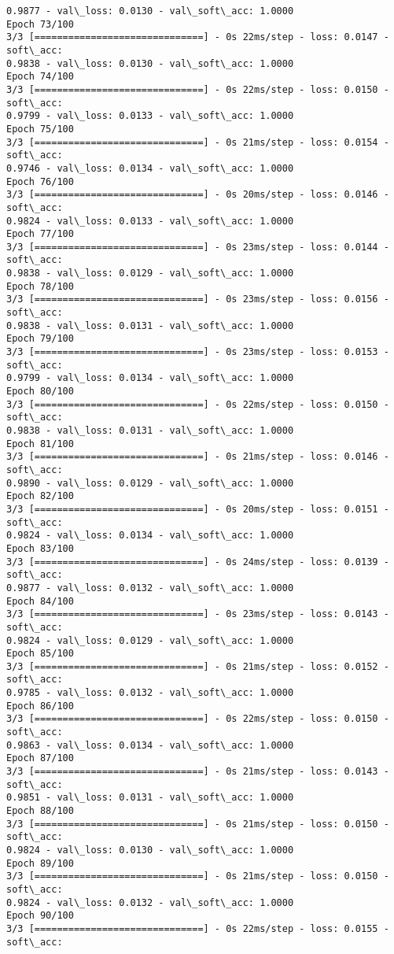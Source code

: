 \documentclass[11pt]{article}
\begin{document}
\begin{Verbatim}[commandchars=\\\{\}]
0.9877 - val\_loss: 0.0130 - val\_soft\_acc: 1.0000
Epoch 73/100
3/3 [==============================] - 0s 22ms/step - loss: 0.0147 - soft\_acc:
0.9838 - val\_loss: 0.0130 - val\_soft\_acc: 1.0000
Epoch 74/100
3/3 [==============================] - 0s 22ms/step - loss: 0.0150 - soft\_acc:
0.9799 - val\_loss: 0.0133 - val\_soft\_acc: 1.0000
Epoch 75/100
3/3 [==============================] - 0s 21ms/step - loss: 0.0154 - soft\_acc:
0.9746 - val\_loss: 0.0134 - val\_soft\_acc: 1.0000
Epoch 76/100
3/3 [==============================] - 0s 20ms/step - loss: 0.0146 - soft\_acc:
0.9824 - val\_loss: 0.0133 - val\_soft\_acc: 1.0000
Epoch 77/100
3/3 [==============================] - 0s 23ms/step - loss: 0.0144 - soft\_acc:
0.9838 - val\_loss: 0.0129 - val\_soft\_acc: 1.0000
Epoch 78/100
3/3 [==============================] - 0s 23ms/step - loss: 0.0156 - soft\_acc:
0.9838 - val\_loss: 0.0131 - val\_soft\_acc: 1.0000
Epoch 79/100
3/3 [==============================] - 0s 23ms/step - loss: 0.0153 - soft\_acc:
0.9799 - val\_loss: 0.0134 - val\_soft\_acc: 1.0000
Epoch 80/100
3/3 [==============================] - 0s 22ms/step - loss: 0.0150 - soft\_acc:
0.9838 - val\_loss: 0.0131 - val\_soft\_acc: 1.0000
Epoch 81/100
3/3 [==============================] - 0s 21ms/step - loss: 0.0146 - soft\_acc:
0.9890 - val\_loss: 0.0129 - val\_soft\_acc: 1.0000
Epoch 82/100
3/3 [==============================] - 0s 20ms/step - loss: 0.0151 - soft\_acc:
0.9824 - val\_loss: 0.0134 - val\_soft\_acc: 1.0000
Epoch 83/100
3/3 [==============================] - 0s 24ms/step - loss: 0.0139 - soft\_acc:
0.9877 - val\_loss: 0.0132 - val\_soft\_acc: 1.0000
Epoch 84/100
3/3 [==============================] - 0s 23ms/step - loss: 0.0143 - soft\_acc:
0.9824 - val\_loss: 0.0129 - val\_soft\_acc: 1.0000
Epoch 85/100
3/3 [==============================] - 0s 21ms/step - loss: 0.0152 - soft\_acc:
0.9785 - val\_loss: 0.0132 - val\_soft\_acc: 1.0000
Epoch 86/100
3/3 [==============================] - 0s 22ms/step - loss: 0.0150 - soft\_acc:
0.9863 - val\_loss: 0.0134 - val\_soft\_acc: 1.0000
Epoch 87/100
3/3 [==============================] - 0s 21ms/step - loss: 0.0143 - soft\_acc:
0.9851 - val\_loss: 0.0131 - val\_soft\_acc: 1.0000
Epoch 88/100
3/3 [==============================] - 0s 21ms/step - loss: 0.0150 - soft\_acc:
0.9824 - val\_loss: 0.0130 - val\_soft\_acc: 1.0000
Epoch 89/100
3/3 [==============================] - 0s 21ms/step - loss: 0.0150 - soft\_acc:
0.9824 - val\_loss: 0.0132 - val\_soft\_acc: 1.0000
Epoch 90/100
3/3 [==============================] - 0s 22ms/step - loss: 0.0155 - soft\_acc:

\end{Verbatim}
\end{document}
